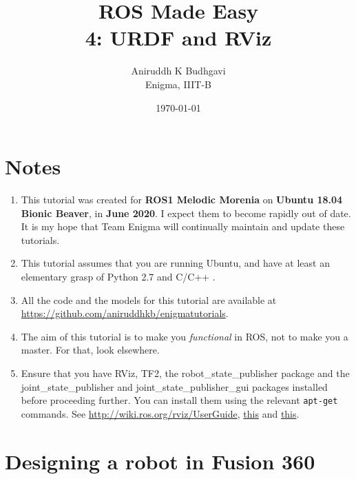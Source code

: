 \documentclass{article}
\title{ROS Made Easy \\4: URDF and RViz}
\date{\today}
\author{Aniruddh K Budhgavi \\Enigma, IIIT-B}
\begin{document}
    \maketitle
    \section{Notes}
    \begin{enumerate}
        \item This tutorial was created for \textbf{ROS1 Melodic Morenia}
        on \textbf{Ubuntu 18.04 Bionic Beaver}, in \textbf{June 2020}.
        I expect them to become rapidly out of date. It is my hope
        that Team Enigma will continually maintain and update these tutorials.
        \item This tutorial assumes that you are running Ubuntu, and have at least an
        elementary grasp of Python 2.7 and C/C++ .
        \item All the code and the models for this tutorial are available at 
        \url{https://github.com/aniruddhkb/enigmatutorials}.
        \item The aim of this tutorial is to make you \emph{functional} in ROS, not to make you a master. For 
        that, look elsewhere.
        \item Ensure that you have RViz, TF2, the robot\_state\_publisher package and the joint\_state\_publisher
        and joint\_state\_publisher\_gui packages installed before proceeding further. You can install them 
        using the relevant \texttt{apt-get} commands. See \url{http://wiki.ros.org/rviz/UserGuide},
        \href{http://wiki.ros.org/tf2/Tutorials/Introduction%20to%20tf2}{this} and
        \href{https://answers.ros.org/question/346665/how-to-install-joint_state_publisher_gui-in-melodic-version-of-ros/}{this}.
    \end{enumerate}
    \section{Designing a robot in Fusion 360}
\end{document}
